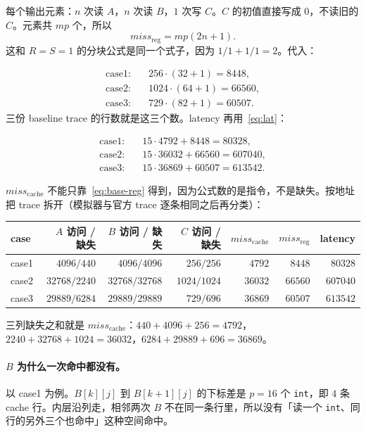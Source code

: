 \documentclass[11pt,a4paper,fontset=fandol]{ctexart}
\newcommand{\code}[1]{\texttt{#1}}
\newcommand{\mreg}{\mathit{miss}_{\mathrm{reg}}}
\newcommand{\mc}{\mathit{miss}_{\mathrm{cache}}}
\begin{document}
每个输出元素：$n$ 次读 $A$，$n$ 次读 $B$，$1$ 次写 $C$。$C$ 的初值直接写成 $0$，不读旧的 $C$。元素共 $mp$ 个，所以
\begin{equation}
\label{eq:base-reg}
\mreg=mp(2n+1).
\end{equation}
这和 $R=S=1$ 的分块公式是同一个式子，因为 $1/1+1/1=2$。代入：

\begin{align*}
\text{case1:}&\quad 256\cdot(32+1)=8448,\\
\text{case2:}&\quad 1024\cdot(64+1)=66560,\\
\text{case3:}&\quad 729\cdot(82+1)=60507.
\end{align*}
三份 baseline trace 的行数就是这三个数。latency 再用~\eqref{eq:lat}：

\begin{align*}
\text{case1:}&\quad 15\cdot4792+8448=80328,\\
\text{case2:}&\quad 15\cdot36032+66560=607040,\\
\text{case3:}&\quad 15\cdot36869+60507=613542.
\end{align*}

$\mc$ 不能只靠~\eqref{eq:base-reg} 得到，因为公式数的是指令，不是缺失。按地址把 trace 拆开（模拟器与官方 trace 逐条相同之后再分类）：

\begin{center}
\small
\begin{tabular}{@{}lrrrrrr@{}}
\toprule
case & $A$ 访问 / 缺失 & $B$ 访问 / 缺失 & $C$ 访问 / 缺失 & $\mc$ & $\mreg$ & latency\\
\midrule
case1 & $4096/440$ & $4096/4096$ & $256/256$ & $4792$ & $8448$ & $80328$\\
case2 & $32768/2240$ & $32768/32768$ & $1024/1024$ & $36032$ & $66560$ & $607040$\\
case3 & $29889/6284$ & $29889/29889$ & $729/696$ & $36869$ & $60507$ & $613542$\\
\bottomrule
\end{tabular}
\end{center}

三列缺失之和就是 $\mc$：$440+4096+256=4792$，$2240+32768+1024=36032$，$6284+29889+696=36869$。

\paragraph{$B$ 为什么一次命中都没有。}
以 case1 为例。$B[k][j]$ 到 $B[k+1][j]$ 的下标差是 $p=16$ 个 \code{int}，即 $4$ 条 cache 行。内层沿列走，相邻两次 $B$ 不在同一条行里，所以没有「读一个 \code{int}、同行的另外三个也命中」这种空间命中。
\end{document}
